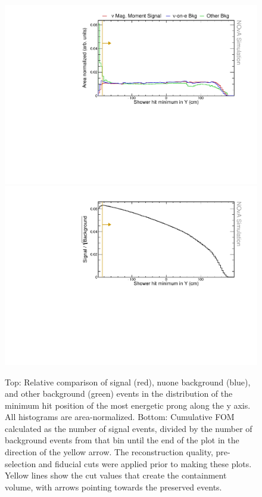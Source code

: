 \begin{figure}[hbtp]
\centering
\includegraphics[width=.9\textwidth]{Plots/NuMMEventSelection/N1Cut_minY.pdf}
\includegraphics[width=.9\textwidth]{Plots/NuMMEventSelection/NuMM_N1Cut_minYright_FOMStats.pdf}
\caption[Hit minimum y containment cut]{Top: Relative comparison of signal (red), \acrshort{nuone} background (blue), and other background (green) events in the distribution of the minimum hit position of the most energetic prong along the y axis. All histograms are area-normalized. Bottom: Cumulative \acrshort{FOM} calculated as the number of signal events, divided by the number of background events from that bin until the end of the plot in the direction of the yellow arrow. The reconstruction quality, pre-selection and fiducial cuts were applied prior to making these plots. Yellow lines show the cut values that create the containment volume, with arrows pointing towards the preserved events.}
\label{fig:NuMMContainmentCutMinY}
\end{figure}


